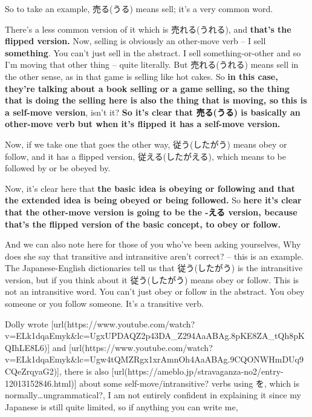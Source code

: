 So to take an example, 売る(うる) means sell; it's a very common word.

{}

There's a less common version of it which is 売れる(うれる), and {\bf that's the flipped version.} Now, selling is obviously an other-move verb -- I sell {\bf something}. You can't just sell in the abstract. I sell something-or-other and so I'm moving that other thing -- quite literally. But 売れる(うれる) means sell in the other sense, as in that game is selling like hot cakes. So {\bf in this case, they're talking about a book selling or a game selling, so the thing that is doing the selling here is also the thing that is moving, so this is a self-move version}, isn't it? {\bf So it's clear that 売る(うる) is basically an other-move verb but when it's flipped it has a self-move version.}

\thinrule

Now, if we take one that goes the other way, 従う(したがう) means obey or follow, and it has a flipped version, 従える(したがえる), which means to be followed by or be obeyed by.

{}

Now, it's clear here that {\bf the basic idea is obeying or following and that the extended idea is being obeyed or being followed.} So {\bf here it's clear that the other-move version is going to be the -える version, because that's the flipped version of the basic concept, to obey or follow.}

\thinrule

And we can also note here for those of you who've been asking yourselves, Why does she say that transitive and intransitive aren't correct? -- this is an example. The Japanese-English dictionaries tell us that 従う(したがう) is the intransitive version, but if you think about it 従う(したがう) means obey or follow. This is not an intransitive word. You can't just obey or follow in the abstract. You obey someone or you follow someone. It's a transitive verb.

Dolly wrote [url(https://www.youtube.com/watch?v=ELk1dqaEmyk&lc=UgxUPDAQZ2p43DA_Z294AaABAg.8pKE8ZA_tQh8pKQIhLE8L6)] and [url(https://www.youtube.com/watch?v=ELk1dqaEmyk&lc=Ugw4tQMZRgx1xrAmnOh4AaABAg.9CQONWHmDUq9CQeZrqyaG2)], there is also [url(https://ameblo.jp/stravaganza-no2/entry-12013152846.html)] about some self-move/intransitive? verbs using を, which is normally\ldots{}ungrammatical?, I am not entirely confident in explaining it since my Japanese is still quite limited, so if anything you can write me,


